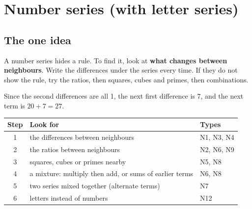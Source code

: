 \documentclass[11pt,a4paper]{article}
\let\oldsubsection\subsection
\renewcommand{\subsection}{\needspace{9\baselineskip}\oldsubsection}
\begin{document}
\clearpage
\section[Number series (N1--N12)]{Number series (with letter series)}\label{ch:N}

\subsection*{The one idea}
A number series hides a rule. To find it, look at \textbf{what changes between neighbours}. Write the differences under the series every time. If they do not show the rule, try the ratios, then squares, cubes and primes, then combinations.

\begin{center}
\par\nopagebreak\smallskip
{\small Since the second differences are all 1, the next first difference is 7, and the next term is $20 + 7 = 27$.}
\end{center}

\begin{center}\small\renewcommand{\arraystretch}{1.18}\setlength{\tabcolsep}{9pt}
\begin{tabularx}{\linewidth}{@{}c >{\raggedright\arraybackslash}X l@{}}
\toprule
\textbf{\color{slate}Step} & \textbf{\color{slate}Look for} & \textbf{\color{slate}Types} \\ \midrule
1 & the differences between neighbours & N1, N3, N4 \\
2 & the ratios between neighbours & N2, N6, N9 \\
3 & squares, cubes or primes nearby & N5, N8 \\
4 & a mixture: multiply then add, or sums of earlier terms & N6, N8 \\
5 & two series mixed together (alternate terms) & N7 \\
6 & letters instead of numbers & N12 \\
\bottomrule
\end{tabularx}\end{center}
\end{document}
